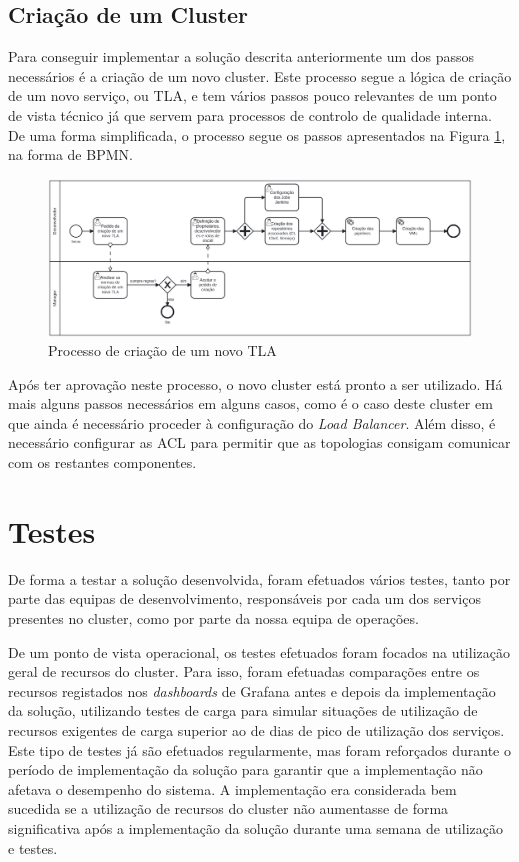 \subsection{Criação de um Cluster}

Para conseguir implementar a solução descrita anteriormente um dos passos necessários é a criação
de um novo \gls{cluster}. Este processo segue a lógica de criação de um novo serviço, ou \ac{TLA}, 
e tem vários passos pouco relevantes de um ponto de vista técnico já que servem para processos de 
controlo de qualidade interna. De uma forma simplificada, o processo segue os passos apresentados 
na Figura \ref{create-tla}, na forma de \ac{BPMN}.

\begin{figure}[H]
  \centerline{\includegraphics[scale=0.12]{media/content/impl/create-tla.png}}
  \caption{Processo de criação de um novo TLA}
  \label{create-tla}
\end{figure}

Após ter aprovação neste processo, o novo \gls{cluster} está pronto a ser utilizado. Há mais 
alguns passos necessários em alguns casos, como é o caso deste \gls{cluster} em que ainda é
necessário proceder à configuração do \textit{Load Balancer}. Além disso, é necessário 
configurar as \ac{ACL} para permitir que as topologias consigam comunicar com os restantes
componentes.

\section{Testes}

De forma a testar a solução desenvolvida, foram efetuados vários testes, tanto por parte das
equipas de desenvolvimento, responsáveis por cada um dos serviços presentes no \gls{cluster},
como por parte da nossa equipa de operações. 

De um ponto de vista operacional, os testes efetuados foram focados na utilização geral de
recursos do \gls{cluster}. Para isso, foram efetuadas comparações entre os recursos registados
nos \textit{dashboards} de Grafana antes e depois da implementação da solução, utilizando testes 
de carga para simular situações de utilização de recursos exigentes de carga superior ao de dias
de pico de utilização dos serviços. Este tipo de testes já são efetuados regularmente, mas foram
reforçados durante o período de implementação da solução para garantir que a implementação não
afetava o desempenho do sistema. A implementação era considerada bem sucedida se a utilização de
recursos do \gls{cluster} não aumentasse de forma significativa após a implementação da solução
durante uma semana de utilização e testes.

